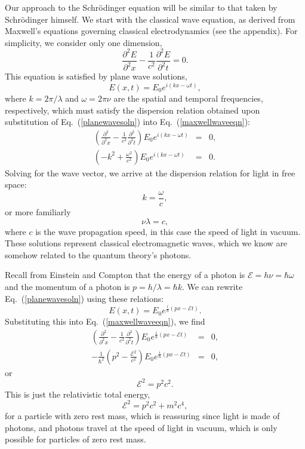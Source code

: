 \documentclass[preprint,footinbib,preprintnumbers,amsmath,amssymb,prb,12pt]{revtex4}
\begin{document}
Our approach to the Schr\"{o}dinger equation will be similar to that
taken by Schr\"{o}dinger himself. We start with the classical wave
equation, as derived from Maxwell's equations governing classical
electrodynamics (see the appendix). For simplicity, we consider only
one dimension,
\begin{equation}
\frac{\partial^2E}{\partial^2x}-\frac{1}{c^2}\frac{\partial^2E}{\partial^2t}=0.\label{maxwellwaveeqn}
\end{equation}
This equation is satisfied by plane wave solutions,
\begin{equation}
E(x,t)=E_0e^{i(kx-\omega t)},\label{planewavesoln}
\end{equation}
where $k=2\pi/\lambda$ and $\omega=2\pi\nu$ are the spatial and
temporal frequencies, respectively, which must satisfy the
dispersion relation obtained upon substitution of
Eq.~(\ref{planewavesoln}) into Eq.~(\ref{maxwellwaveeqn}):
\begin{eqnarray}
\left(\frac{\partial^2}{\partial^2x}-\frac{1}{c^2}\frac{\partial^2}{\partial^2t}\right)E_0e^{i(kx-\omega t)}&=&0,\\
\left(-k^2+\frac{\omega^2}{c^2}\right)E_0e^{i(kx-\omega t)}&=&0.
\end{eqnarray}
Solving for the wave vector, we arrive at the dispersion relation
for light in free space:
\begin{equation}
k=\frac{\omega}{c},\label{dispersion1}
\end{equation}
or more familiarly
\begin{equation}
\nu\lambda=c,\label{dispersion2}
\end{equation}
where $c$ is the wave propagation speed, in this case the speed of
light in vacuum. These solutions represent classical electromagnetic
waves, which we know are somehow related to the quantum theory's
photons.

Recall from Einstein and Compton that the energy of a photon is
$\mathcal{E}=h\nu=\hbar\omega$ and the momentum of a photon is
$p=h/\lambda=\hbar k$.  We can rewrite Eq.~(\ref{planewavesoln})
using these relations:
\begin{equation}
E(x,t)=E_0e^{\frac{i}{\hbar}(px-\mathcal{E} t)}.\label{planewavesoln2}
\end{equation}
Substituting this into Eq.~(\ref{maxwellwaveeqn}), we find
\begin{eqnarray}\label{waveequ}
\left(\frac{\partial^2}{\partial^2x}-\frac{1}{c^2}\frac{\partial^2}{\partial^2t}\right)E_0e^{\frac{i}{\hbar}(px-\mathcal{E} t)}&=&0,\label{photon1}\\
-\frac{1}{\hbar^2}\left(p^2-\frac{\mathcal{E}^2}{c^2}\right)E_0e^{\frac{i}{\hbar}(px-\mathcal{E}
t)}&=&0\label{photon2},
\end{eqnarray}
or
\begin{equation}
\mathcal{E}^2=p^2c^2.
\end{equation}
This is just the relativistic total energy,
\begin{equation}
\mathcal{E}^2=p^2c^2+m^2c^4,
\end{equation}
for a particle with zero rest mass, which is reassuring since light
is made of photons, and photons travel at the speed of light in
vacuum, which is only possible for particles of zero rest mass.
\end{document}
